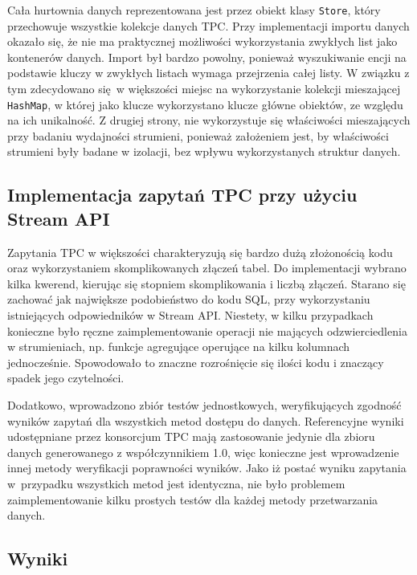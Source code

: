 \documentclass[12pt,twoside,openright]{extarticle}
\begin{document}
    Cała hurtownia danych reprezentowana jest przez obiekt klasy \texttt{Store}, który przechowuje wszystkie kolekcje danych TPC. Przy implementacji importu danych okazało się, że nie ma praktycznej możliwości wykorzystania zwykłych list jako kontenerów danych. Import był bardzo powolny, ponieważ wyszukiwanie encji na podstawie kluczy w zwykłych listach wymaga przejrzenia całej listy. W związku z tym zdecydowano się w większości miejsc na wykorzystanie kolekcji mieszającej \texttt{HashMap}, w której jako klucze wykorzystano klucze główne obiektów, ze względu na ich unikalność. Z drugiej strony, nie wykorzystuje się właściwości mieszających przy badaniu wydajności strumieni, ponieważ założeniem jest, by właściwości strumieni były badane w izolacji, bez wpływu wykorzystanych struktur danych.


\subsection{Implementacja zapytań TPC przy użyciu Stream API}

Zapytania TPC w większości charakteryzują się bardzo dużą złożonością kodu oraz wykorzystaniem skomplikowanych złączeń tabel. Do implementacji wybrano kilka kwerend, kierując się stopniem skomplikowania i liczbą złączeń. Starano się zachować jak największe podobieństwo do kodu SQL, przy wykorzystaniu istniejących odpowiedników w Stream API. Niestety, w kilku przypadkach konieczne było ręczne zaimplementowanie operacji nie mających odzwierciedlenia w strumieniach, np. funkcje agregujące operujące na kilku kolumnach jednocześnie. Spowodowało to znaczne rozrośnięcie się ilości kodu i znaczący spadek jego czytelności. 

    Dodatkowo, wprowadzono zbiór testów jednostkowych, weryfikujących zgodność wyników zapytań dla wszystkich metod dostępu do danych. Referencyjne wyniki \cite{tpcresults} udostępniane przez konsorcjum TPC mają zastosowanie jedynie dla zbioru danych generowanego z współczynnikiem 1.0, więc konieczne jest wprowadzenie innej metody weryfikacji poprawności wyników. Jako iż postać wyniku zapytania w~przypadku wszystkich metod jest identyczna, nie było problemem zaimplementowanie kilku prostych testów dla każdej metody przetwarzania danych.


\newpage
\subsection{Wyniki}
\end{document}
